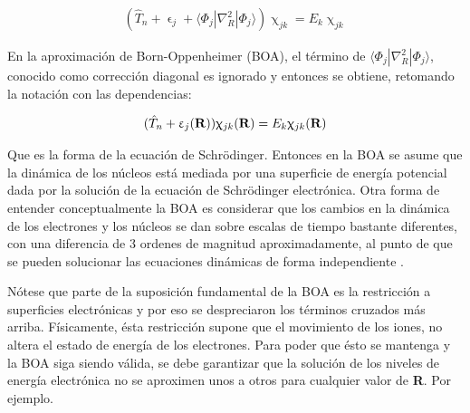 \documentclass [11pt]{article}
\begin{document}
\begin{eqnarray*}
    (\hat T_n+\upvarepsilon_j+\langle\Phi_j|{\nabla_R^2}|\Phi_j\rangle) \upchi_{jk} =  E_k\upchi_{jk}
\end{eqnarray*}

En la aproximación de Born-Oppenheimer (BOA), el término de $\langle\Phi_j|{\nabla_R^2}|\Phi_j\rangle$, conocido como corrección diagonal es ignorado y entonces se obtiene, retomando la notación con las dependencias:

\begin{eqnarray*}
    (\hat T_n+\upvarepsilon_j({\bf R})) \upchi_{jk}({\bf R}) =  E_k\upchi_{jk}({\bf R})
\end{eqnarray*}

Que es la forma de la ecuación de Schrödinger. Entonces en la BOA se asume que la dinámica de los núcleos está mediada por una superficie de energía potencial dada por la solución de la ecuación de Schrödinger electrónica. Otra forma de entender conceptualmente la BOA es considerar que los cambios en la dinámica de los electrones y los núcleos se dan sobre escalas de tiempo bastante diferentes, con una diferencia de 3 ordenes de magnitud aproximadamente, al punto de que se pueden solucionar las ecuaciones dinámicas de forma independiente \cite{bransden}.

Nótese que parte de la suposición fundamental de la BOA es la restricción a superficies electrónicas y por eso se despreciaron los términos cruzados más arriba. Físicamente, ésta restricción supone que el movimiento de los iones, no altera el estado de energía de los electrones. Para poder que ésto se mantenga y la BOA siga siendo válida, se debe garantizar que la solución de los niveles de energía electrónica no se aproximen unos a otros para cualquier valor de {\bf R}. Por ejemplo. 
\end{document}
